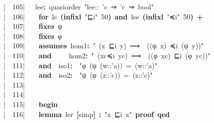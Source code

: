 \documentclass{article}
\newcommand{\syntaxKEYWORDA}[1]{\textcolor[rgb]{0.0,0.4,0.6}{\textbf{#1}}}
\newcommand{\syntaxKEYWORDB}[1]{\textcolor[rgb]{0.0,0.6,0.4}{\textbf{#1}}}
\newcommand{\syntaxLITERALA}[1]{\textcolor[rgb]{1.0,0.0,0.8}{#1}}
\newcommand{\syntaxOPERATOR}[1]{\textcolor[rgb]{0.0,0.0,0.0}{\textbf{#1}}}
\newcommand{\syntaxKEYWORDA}[1]{\textcolor[rgb]{0.0,0.4,0.6}{\textbf{#1}}}
\newcommand{\syntaxKEYWORDB}[1]{\textcolor[rgb]{0.0,0.6,0.4}{\textbf{#1}}}
\newcommand{\syntaxLITERALA}[1]{\textcolor[rgb]{1.0,0.0,0.8}{#1}}
\newcommand{\syntaxOPERATOR}[1]{\textcolor[rgb]{0.0,0.0,0.0}{\textbf{#1}}}
\newcommand{\syntaxKEYWORDA}[1]{\textcolor[rgb]{0.0,0.4,0.6}{\textbf{#1}}}
\newcommand{\syntaxKEYWORDB}[1]{\textcolor[rgb]{0.0,0.6,0.4}{\textbf{#1}}}
\newcommand{\syntaxLITERALA}[1]{\textcolor[rgb]{1.0,0.0,0.8}{#1}}
\newcommand{\syntaxOPERATOR}[1]{\textcolor[rgb]{0.0,0.0,0.0}{\textbf{#1}}}
\newcommand{\syntaxKEYWORDA}[1]{\textcolor[rgb]{0.0,0.4,0.6}{#1}}
\newcommand{\syntaxKEYWORDB}[1]{\textcolor[rgb]{0.0,0.6,0.4}{#1}}
\newcommand{\syntaxLITERALA}[1]{\textcolor[rgb]{1.0,0.0,0.8}{\textbf{#1}}}
\newcommand{\syntaxOPERATOR}[1]{\textcolor[rgb]{0.0,0.0,0.0}{#1}}
\newcommand{\syntaxKEYWORDA}[1]{\textcolor[rgb]{0.0,0.4,0.6}{\textbf{#1}}}
\newcommand{\syntaxKEYWORDB}[1]{\textcolor[rgb]{0.0,0.6,0.4}{\textbf{#1}}}
\newcommand{\syntaxLITERALA}[1]{\textcolor[rgb]{1.0,0.0,0.8}{#1}}
\newcommand{\syntaxOPERATOR}[1]{\textcolor[rgb]{0.0,0.0,0.0}{\textbf{#1}}}
\newcommand{\syntaxKEYWORDA}[1]{\textcolor[rgb]{0.0,0.4,0.6}{\textbf{#1}}}
\newcommand{\syntaxKEYWORDB}[1]{\textcolor[rgb]{0.0,0.6,0.4}{\textbf{#1}}}
\newcommand{\syntaxLITERALA}[1]{\textcolor[rgb]{1.0,0.0,0.8}{#1}}
\newcommand{\syntaxOPERATOR}[1]{\textcolor[rgb]{0.0,0.0,0.0}{\textbf{#1}}}
\newcommand{\syntaxKEYWORDA}[1]{\textcolor[rgb]{0.0,0.0,0.0}{#1}}
\newcommand{\syntaxKEYWORDB}[1]{\textcolor[rgb]{0.0,0.0,0.0}{#1}}
\newcommand{\gutter}[1]{\textcolor[rgb]{0,0,0}{{|}#1}}
\newcommand{\gutterH}[1]{\textcolor[rgb]{1,0,0}{{|}#1}}
\begin{document}
\gutterH{\ \ 105{|}\ }{\ }{\ }lee\syntaxOPERATOR{:}{\ }quasi\usebox{\underscorebox}order{\ }\syntaxLITERALA{"lee::{\ }'c{\ }⇒{\ }'c{\ }⇒{\ }bool"}\hspace*{\fill}\\
\gutter{\ \ 106{|}\ }{\ }{\ }{\ }\syntaxKEYWORDB{for}{\ }le{\ }\syntaxOPERATOR{(}\syntaxKEYWORDB{infixl}{\ }\syntaxLITERALA{"⊑i"}{\ }50\syntaxOPERATOR{)}{\ }\syntaxKEYWORDB{and}{\ }lee{\ }\syntaxOPERATOR{(}\syntaxKEYWORDB{infixl}{\ }\syntaxLITERALA{"≼i"}{\ }50\syntaxOPERATOR{)}{\ }\syntaxOPERATOR{+}\hspace*{\fill}\\
\gutter{\ \ 107{|}\ }{\ }{\ }{\ }\syntaxKEYWORDB{fixes}{\ }ψ\hspace*{\fill}\\
\gutter{\ \ 108{|}\ }{\ }{\ }{\ }\syntaxKEYWORDB{fixes}{\ }φ\hspace*{\fill}\\
\gutter{\ \ 109{|}\ }{\ }{\ }{\ }\syntaxKEYWORDB{assumes}{\ }hom1\syntaxOPERATOR{:}{\ }\syntaxLITERALA{"{\ }(x{\ }⊑i{\ }y){\ }⟹{\ }{\ }((ψ{\ }x){\ }≼i{\ }(ψ{\ }y))"}{\ }\hspace*{\fill}\\
\gutterH{\ \ 110{|}\ }{\ }{\ }{\ }\syntaxKEYWORDB{and}{\ }{\ }{\ }{\ }{\ }hom2\syntaxOPERATOR{:}{\ }\syntaxLITERALA{"{\ }(xc≼i{\ }yc){\ }⟹{\ }{\ }((φ{\ }xc){\ }⊑i{\ }(φ{\ }yc))"}{\ }\hspace*{\fill}\\
\gutter{\ \ 111{|}\ }{\ }{\ }{\ }\syntaxKEYWORDB{and}{\ }{\ }iso1\syntaxOPERATOR{:}{\ }{\ }\syntaxLITERALA{"φ{\ }(ψ{\ }(w::'a)){\ }={\ }(w::'a)"}\hspace*{\fill}\\
\gutter{\ \ 112{|}\ }{\ }{\ }{\ }\syntaxKEYWORDB{and}{\ }{\ }iso2\syntaxOPERATOR{:}{\ }{\ }\syntaxLITERALA{"ψ{\ }(φ{\ }(z::'c)){\ }={\ }(z::'c)"}\hspace*{\fill}\\
\gutter{\ \ 113{|}\ }{\ }\hspace*{\fill}\\
\gutter{\ \ 114{|}\ }{\ }{\ }{\ }\hspace*{\fill}\\
\gutterH{\ \ 115{|}\ }{\ }{\ }{\ }\syntaxKEYWORDB{begin}\hspace*{\fill}\\
\gutter{\ \ 116{|}\ }{\ }{\ }{\ }\syntaxKEYWORDA{lemma}{\ }ler{\ }\syntaxOPERATOR{{[}}simp\syntaxOPERATOR{{]}}{\ }\syntaxOPERATOR{:}{\ }\syntaxLITERALA{"x{\ }⊑i{\ }x"}{\ }\syntaxKEYWORDA{proof}{\ }\syntaxKEYWORDA{qed}\hspace*{\fill}\\
\end{document}
